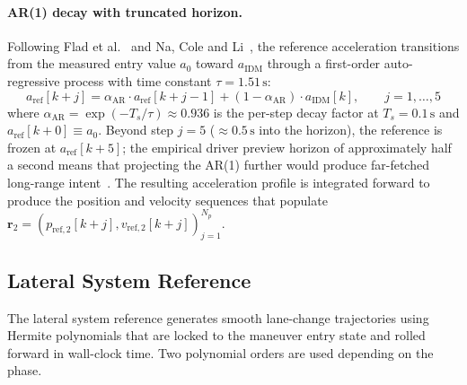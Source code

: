 \documentclass[12pt,a4paper,oneside]{report}
\begin{document}
\paragraph{AR(1) decay with truncated horizon.} Following Flad et al.~\cite{fladCooperativeSharedControl2017} and Na, Cole and Li~\cite{naTwoNashequilibriumbasedSteering2022}, the reference acceleration transitions from the measured entry value $a_0$ toward $a_{\text{IDM}}$ through a first-order auto-regressive process with time constant $\tau = 1.51\,\mathrm{s}$:
\begin{equation}
a_{\text{ref}}[k+j] = \alpha_{\text{AR}} \cdot a_{\text{ref}}[k+j-1] + (1 - \alpha_{\text{AR}}) \cdot a_{\text{IDM}}[k], \qquad j = 1, \ldots, 5
\label{eq:ar1_decay}
\end{equation}
where $\alpha_{\text{AR}} = \exp(-T_s / \tau) \approx 0.936$ is the per-step decay factor at $T_s = 0.1\,\mathrm{s}$ and $a_{\text{ref}}[k+0] \equiv a_0$. Beyond step $j = 5$ ($\approx 0.5\,\mathrm{s}$ into the horizon), the reference is frozen at $a_{\text{ref}}[k+5]$; the empirical driver preview horizon of approximately half a second means that projecting the AR(1) further would produce far-fetched long-range intent~\cite{naTwoNashequilibriumbasedSteering2022}. The resulting acceleration profile is integrated forward to produce the position and velocity sequences that populate $\mathbf{r}_2 = (p_{\text{ref},2}[k+j], v_{\text{ref},2}[k+j])_{j=1}^{N_p}$.

\subsection{Lateral System Reference}
\label{sec:lat_sys_ref}

The lateral system reference generates smooth lane-change trajectories using Hermite polynomials that are locked to the maneuver entry state and rolled forward in wall-clock time. Two polynomial orders are used depending on the phase.
\end{document}
